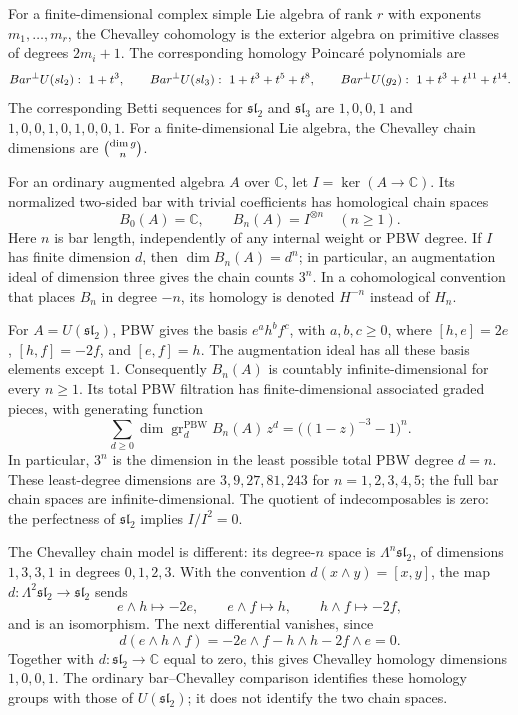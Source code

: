 \begin{calculation}
\label{calc:simple-spine}
For a finite-dimensional complex simple Lie algebra of rank $r$ with
exponents $m_1,\dots,m_r$, the
Chevalley cohomology is the exterior algebra on primitive classes of degrees
$2m_i+1$. The corresponding homology Poincar\'e polynomials are
\[
 Bar^{\perp} U(sl_2):\ 1+t^3,
 \qquad
 Bar^{\perp} U(sl_3):\ 1+t^3+t^5+t^8,
 \qquad
 Bar^{\perp} U(g_2):\ 1+t^3+t^{11}+t^{14}.
\]
The corresponding Betti sequences for $\mathfrak{sl}_2$ and $\mathfrak{sl}_3$ are
$1,0,0,1$ and $1,0,0,1,0,1,0,0,1$.
For a finite-dimensional Lie algebra, the Chevalley chain dimensions are
$\binom{\dim g}{n}$.

For an ordinary augmented algebra $A$ over $\mathbb C$, let
$I=\ker(A\to\mathbb C)$.  Its normalized two-sided bar with trivial
coefficients has homological chain spaces
\[
 B_0(A)=\mathbb C,\qquad B_n(A)=I^{\otimes n}\quad(n\ge1).
\]
Here $n$ is bar length, independently of any internal weight or PBW degree.
If $I$ has finite dimension $d$, then $\dim B_n(A)=d^n$; in particular,
an augmentation ideal of dimension three gives the chain counts $3^n$.
In a cohomological convention that places $B_n$ in degree $-n$, its homology
is denoted $H^{-n}$ instead of $H_n$.

For $A=U(\mathfrak{sl}_2)$, PBW gives the basis
$e^a h^b f^c$, with $a,b,c\ge0$, where
$[h,e]=2e$, $[h,f]=-2f$, and $[e,f]=h$.
The augmentation ideal has all these basis elements except $1$.
Consequently $B_n(A)$ is countably infinite-dimensional for every $n\ge1$.
Its total PBW filtration has finite-dimensional associated graded pieces,
with generating function
\[
 \sum_{d\ge0}\dim\operatorname{gr}^{\mathrm{PBW}}_d B_n(A)\,z^d
 =\bigl((1-z)^{-3}-1\bigr)^n.
\]
In particular, $3^n$ is the dimension in the least possible total PBW degree
$d=n$. These least-degree dimensions are $3,9,27,81,243$ for
$n=1,2,3,4,5$; the full bar chain spaces are infinite-dimensional. The quotient of
indecomposables is zero: the perfectness of $\mathfrak{sl}_2$ implies $I/I^2=0$.

The Chevalley chain model is different: its degree-$n$ space is
$\Lambda^n\mathfrak{sl}_2$, of dimensions $1,3,3,1$ in degrees $0,1,2,3$.
With the convention $d(x\wedge y)=[x,y]$, the map
$d:\Lambda^2\mathfrak{sl}_2\to\mathfrak{sl}_2$ sends
\[
 e\wedge h\longmapsto-2e,\qquad
 e\wedge f\longmapsto h,\qquad
 h\wedge f\longmapsto-2f,
\]
and is an isomorphism.  The next differential vanishes, since
\[
 d(e\wedge h\wedge f)
 =-2e\wedge f-h\wedge h-2f\wedge e=0.
\]
Together with $d:\mathfrak{sl}_2\to\mathbb C$ equal to zero, this gives
Chevalley homology dimensions $1,0,0,1$.  The ordinary bar--Chevalley
comparison identifies these homology groups with those of $U(\mathfrak{sl}_2)$;
it does not identify the two chain spaces.

\end{calculation}

